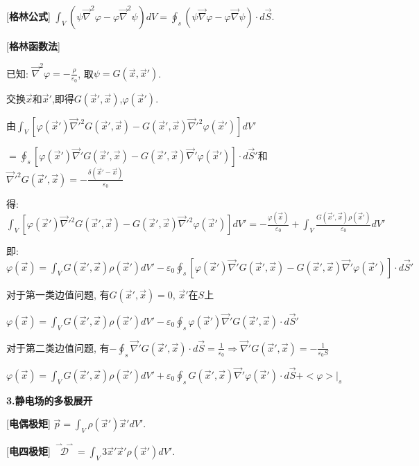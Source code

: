 [\textbf{格林公式}] $\int_V(\psi\vec\nabla^2\varphi-\varphi\vec\nabla^2\psi)dV=\oint_s(\psi\vec\nabla\varphi-\varphi\vec\nabla\psi)\cdot d\vec S$.\par

[\textbf{格林函数法}]\par
\qquad 已知: $\vec\nabla^2\varphi=-\frac{\rho}{\varepsilon_0}$, 取$\psi=G(\vec x,\vec x')$.\par
\qquad 交换$\vec x$和$\vec x'$,即得$G(\vec x',\vec x)$,$\varphi(\vec x')$.\par
\qquad 由$\int_V\left[\varphi(\vec x')\vec\nabla'^2G(\vec x',\vec x)-G(\vec x',\vec x)\vec\nabla'^2\varphi(\vec x')\right]dV'$ \par
\qquad \quad $=\oint_s\left[\varphi(\vec x')\vec\nabla'G(\vec x',\vec x)-G(\vec x',\vec x)\vec\nabla'\varphi(\vec x')\right]\cdot d\vec S'$和$\vec\nabla'^2G(\vec x',\vec x)=-\frac{\delta(\vec x'-\vec x)}{\varepsilon_0}$\par
\qquad \qquad 得:$\int_V\left[\varphi(\vec x')\vec\nabla'^2G(\vec x',\vec x)-G(\vec x',\vec x)\vec\nabla'^2\varphi(\vec x')\right]dV'=-\frac{\varphi(\vec x)}{\varepsilon_0}+\int_V\frac{G(\vec x',\vec x)\rho(\vec x')}{\varepsilon_0}dV'$\par
\qquad \quad 即:$\varphi(\vec x)=\int_VG(\vec x',\vec x)\rho(\vec x')dV'-\varepsilon_0\oint_s\left[\varphi(\vec x')\vec\nabla'G(\vec x',\vec x)-G(\vec x',\vec x)\vec\nabla'\varphi(\vec x')\right]\cdot d\vec S'$\par
\qquad 对于第一类边值问题, 有$G(\vec x',\vec x)=0$, $\vec x'$在$S$上\par
\qquad \quad $\varphi(\vec x)=\int_VG(\vec x',\vec x)\rho(\vec x')dV'-\varepsilon_0\oint_s\varphi(\vec x')\vec\nabla'G(\vec x',\vec x)\cdot d\vec S'$\par
\qquad 对于第二类边值问题, 有$-\oint_s\vec\nabla'G(\vec x',\vec x)\cdot d\vec S=\frac{1}{\varepsilon_0}\Rightarrow \vec\nabla'G(\vec x',\vec x)=-\frac{1}{\varepsilon_0S}$\par
\qquad \quad $\varphi(\vec x)=\int_VG(\vec x',\vec x)\rho(\vec x')dV'+\varepsilon_0\oint_sG(\vec x',\vec x)\vec\nabla'\varphi(\vec x')\cdot d\vec S+<\varphi>|_s$

\begin{center}
 \textbf{3.静电场的多极展开}
\end{center}

[\textbf{电偶极矩}] $\vec p=\int_V\rho(\vec x')\vec x'dV'$.\par

[\textbf{电四极矩}] $\overset{\rightharpoonup\!\!\!\! \rightharpoonup}{\mathscr{D}}=\int_V3\vec x'\vec x'\rho(\vec x')dV'$.\par

